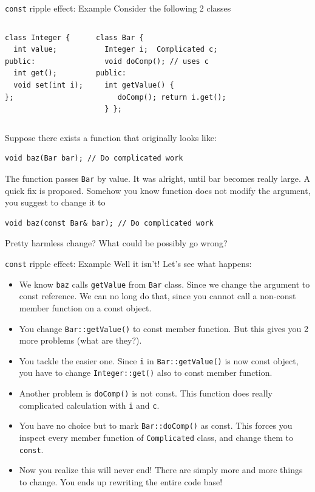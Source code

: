 \begin{frame}[fragile]{\texttt{const} ripple effect: Example }
Consider the following 2 classes
\begin{columns}

\vspace{-.2in}
\begin{verbatim}
class Integer {
  int value;
public:
  int get();
  void set(int i);
};
\end{verbatim}

\vspace{-.2in}
\begin{verbatim}
class Bar {
  Integer i;  Complicated c;
  void doComp(); // uses c
public:
  int getValue() { 
     doComp(); return i.get(); 
  } };
\end{verbatim}
\end{columns}

Suppose there exists a function that originally looks like:
\begin{verbatim}
void baz(Bar bar); // Do complicated work
\end{verbatim}
The function passes \texttt{Bar} by value. It was alright, until bar becomes really large. A quick fix is proposed. Somehow you know function does not modify the argument, you suggest to change it to 
\begin{verbatim}
void baz(const Bar& bar); // Do complicated work
\end{verbatim}
Pretty harmless change? What could be possibly go wrong?
\end{frame}

\begin{frame}{\texttt{const} ripple effect: Example}
Well it isn't! Let's see what happens:
\begin{itemize}
	\small
	\item We know \texttt{baz} calls \texttt{getValue} from \texttt{Bar} class. Since we change the argument to const reference. We can no long do that, since you cannot call a non-const member function on a const object.
	\item You change \texttt{Bar::getValue()} to const member function. But this gives you 2 more problems (what are they?).
	\item You tackle the easier one. Since \texttt{i} in \texttt{Bar::getValue()} is now const object, you have to change \texttt{Integer::get()} also to const member function.
	\item Another problem is \texttt{doComp()} is not const. This function does really complicated calculation with \texttt{i} and \texttt{c}. 
	\item You have no choice but to mark \texttt{Bar::doComp()} as const. This forces you inspect every member function of \texttt{Complicated} class, and change them to \texttt{const}.
	\item Now you realize this will never end! There are simply more and more things to change. You ends up rewriting the entire code base! 
\end{itemize}
\end{frame}

